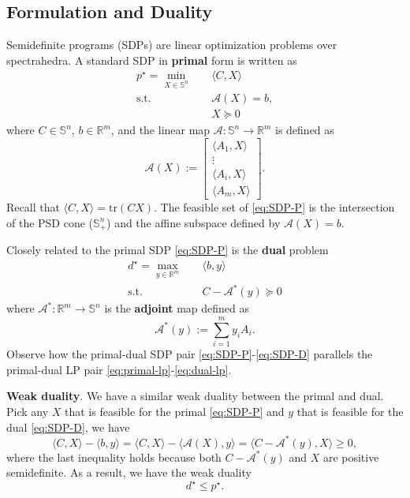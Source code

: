 \documentclass[
]{book}
\theoremstyle{definition}
\theoremstyle{definition}
\theoremstyle{definition}
\theoremstyle{definition}
\theoremstyle{remark}
\begin{document}
\subsection{Formulation and Duality}\label{formulation-and-duality}

Semidefinite programs (SDPs) are linear optimization problems over spectrahedra. A standard SDP in \textbf{primal} form is written as
\begin{equation}
\boxed{
\begin{split}
p^\star = \min_{X \in \mathbb{S}^{n}} & \quad \langle C, X \rangle \\
\mathrm{s.t.}& \quad \mathcal{A}(X) = b, \\
& \quad X \succeq 0
\end{split}
}
\label{eq:SDP-P}
\end{equation}
where \(C \in \mathbb{S}^{n}\), \(b \in \mathbb{R}^{m}\), and the linear map \(\mathcal{A}: \mathbb{S}^{n} \rightarrow \mathbb{R}^{m}\) is defined as
\[
\mathcal{A}(X) := \begin{bmatrix} \langle A_1, X \rangle \\
\vdots \\ \langle A_i, X \rangle \\ \langle A_m, X \rangle \end{bmatrix}.
\]
Recall that \(\langle C, X \rangle = \mathrm{tr}(CX)\). The feasible set of \eqref{eq:SDP-P} is the intersection of the PSD cone (\(\mathbb{S}^{n}_{+}\)) and the affine subspace defined by \(\mathcal{A}(X) = b\).

Closely related to the primal SDP \eqref{eq:SDP-P} is the \textbf{dual} problem
\begin{equation}
\boxed{
\begin{split}
d^\star = \max_{y \in \mathbb{R}^{m}} & \quad \langle b, y \rangle \\
\mathrm{s.t.}& \quad C - \mathcal{A}^* (y) \succeq 0
\end{split}
}
\label{eq:SDP-D}
\end{equation}
where \(\mathcal{A}^{*}: \mathbb{R}^{m} \rightarrow \mathbb{S}^{n}\) is the \textbf{adjoint} map defined as
\[
\mathcal{A}^*(y) := \sum_{i=1}^m y_i A_i.
\]
Observe how the primal-dual SDP pair \eqref{eq:SDP-P}-\eqref{eq:SDP-D} parallels the primal-dual LP pair \eqref{eq:primal-lp}-\eqref{eq:dual-lp}.

\textbf{Weak duality}. We have a similar weak duality between the primal and dual. Pick any \(X\) that is feasible for the primal \eqref{eq:SDP-P} and \(y\) that is feasible for the dual \eqref{eq:SDP-D}, we have
\[
\boxed{\langle C, X \rangle - \langle b, y \rangle = \langle C, X \rangle - \langle \mathcal{A}(X), y \rangle = \langle C - \mathcal{A}^* (y), X \rangle \geq 0,}
\]
where the last inequality holds because both \(C - \mathcal{A}^*(y)\) and \(X\) are positive semidefinite. As a result, we have the weak duality
\[
d^\star \leq p^\star.
\]
\end{document}
